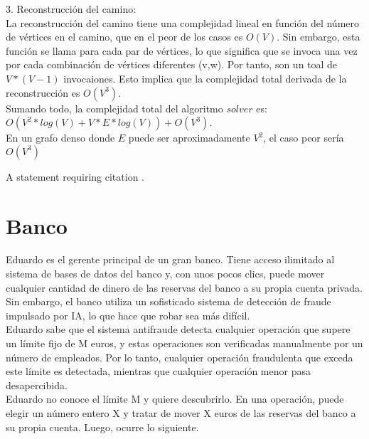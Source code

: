 \documentclass[
10pt, %
a4paper, %
oneside, %
headinclude,footinclude, %
BCOR5mm, %
]{scrartcl}
\begin{document}
3. Reconstrucción del camino:\\

La reconstrucción del camino tiene una complejidad lineal en función del número de vértices en el camino, que en el peor 
de los casos es $O(V)$. Sin embargo, esta función se llama para cada par de vértices, lo que significa que se invoca una vez por cada 
combinación de vértices diferentes (v,w). Por tanto, son un toal de $V*(V-1)$ invocaiones. Esto implica que la complejidad total derivada de la 
reconstrucción es $O(V^3)$. \\

Sumando todo, la complejidad total del algoritmo $solver$ es: $O(V^2 * log(V) + V * E*log(V) ) + O(V^3)$. \\

En un grafo denso donde $E$ puede ser aproximadamente $V^2$, el caso peor sería $O(V^3)$





A statement requiring citation \cite{Figueredo:2009dg}.


 

\section{Banco}

Eduardo es el gerente principal de un gran banco. Tiene acceso ilimitado al sistema de bases de datos del banco y, con unos pocos clics, puede mover cualquier cantidad de dinero de las reservas del banco a su propia cuenta privada. Sin embargo, el banco utiliza un sofisticado sistema de detección de fraude impulsado por IA, lo que hace que robar sea más difícil. \\

Eduardo sabe que el sistema antifraude detecta cualquier operación que supere un límite fijo de M euros, y estas operaciones son verificadas manualmente por un número de empleados. Por lo tanto, cualquier operación fraudulenta que exceda este límite es detectada, mientras que cualquier operación menor pasa desapercibida.\\

Eduardo no conoce el límite M y quiere descubrirlo. En una operación, puede elegir un número entero X y tratar de mover X euros de las reservas del banco a su propia cuenta. Luego, ocurre lo siguiente.\\
\end{document}
